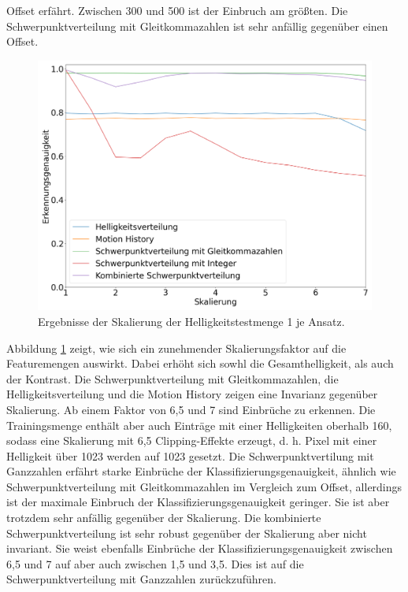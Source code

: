 Offset erfährt. Zwischen 300 und 500 ist der Einbruch am größten. Die Schwerpunktverteilung mit Gleitkommazahlen ist sehr anfällig gegenüber einen Offset.
\begin{figure}[h!]
    \centering
    \includegraphics[width=\linewidth]{images/brightness_scaling.png}
    \caption{Ergebnisse der Skalierung der Helligkeitstestmenge 1 je Ansatz.}
    \label{fig:brightness_scaling}
\end{figure}
\newline
\newline
Abbildung \ref{fig:brightness_scaling} zeigt, wie sich ein zunehmender Skalierungsfaktor auf die Featuremengen auswirkt. Dabei erhöht sich sowhl die Gesamthelligkeit, als auch der Kontrast. Die Schwerpunktverteilung mit
Gleitkommazahlen, die Helligkeitsverteilung und die Motion History zeigen eine Invarianz gegenüber Skalierung. Ab einem Faktor von 6,5 und 7 sind Einbrüche zu erkennen. Die Trainingsmenge enthält aber auch Einträge mit
einer Helligkeiten oberhalb 160, sodass eine Skalierung mit 6,5 Clipping-Effekte erzeugt, d. h. Pixel mit einer Helligkeit über 1023 werden auf 1023 gesetzt. Die Schwerpunktvertilung mit Ganzzahlen erfährt starke Einbrüche
der Klassifizierungsgenauigkeit, ähnlich wie Schwerpunktverteilung mit Gleitkommazahlen im Vergleich zum Offset, allerdings ist der maximale Einbruch der Klassifizierungsgenauigkeit geringer. Sie ist aber trotzdem sehr
anfällig gegenüber der Skalierung. Die kombinierte Schwerpunktverteilung ist sehr robust gegenüber der Skalierung aber nicht invariant. Sie weist ebenfalls Einbrüche der Klassifizierungsgenauigkeit zwischen 6,5 und 7 auf
aber auch zwischen 1,5 und 3,5. Dies ist auf die Schwerpunktverteilung mit Ganzzahlen zurückzuführen.
